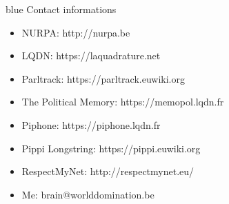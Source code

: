 \documentclass{beamer}
\begin{document}
\begin{frame}[fragile]{}
\begin{LARGE}
\begin{color}{blue}
    Contact informations
\end{color}
\end{LARGE}
\vspace{3mm}
\begin{itemize}
    \item NURPA: http://nurpa.be
    \item LQDN: https://laquadrature.net
    \item Parltrack: https://parltrack.euwiki.org
    \item The Political Memory: https://memopol.lqdn.fr
    \item Piphone: https://piphone.lqdn.fr
    \item Pippi Longstring: https://pippi.euwiki.org
    \item RespectMyNet: http://respectmynet.eu/
    \item Me: brain@worlddomination.be
\end{itemize}
\end{frame}
\end{document}
